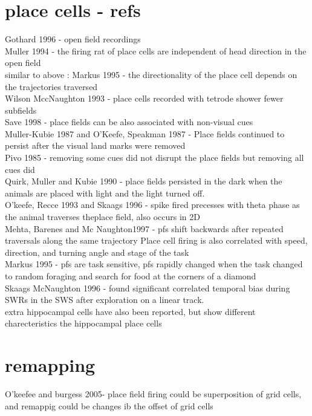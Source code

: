\documentclass{article}
\begin{document}
\section*{place cells - refs}
Gothard 1996 - open field recordings \\
Muller 1994 - the firing rat of place cells are independent of head direction in the open field\\
similar to above : Markus 1995 - the directionality of the place cell depends on the trajectories traversed\\
Wilson MccNaughton 1993 - place cells recorded with tetrode shower fewer subfields\\
Save 1998 - place fields can be also associated with non-visual cues\\
Muller-Kubie 1987 and O'Keefe, Speakman 1987 - Place fields continued to persist after the visual land marks were removed \\
Pivo 1985 - removing some cues did not disrupt the place fields but removing all cues did\\
Quirk, Muller and Kubie 1990 - place fields persisted in the dark when the animals are placed with light and the light turned off.\\
O'keefe, Recce 1993 and Skaags 1996 - spike fired precesses with theta phase as the animal traverses theplace field, also occurs in 2D\\
Mehta, Barenes and Mc Naughton1997 - pfs shift backwards after repeated traversals along the same trajectory 
Place cell firing is also correlated with speed, direction, and turning angle  and stage of the task \\
Markus 1995 - pfs are task sensitive, pfs rapidly changed when the task changed to random foraging and search for food at the corners of a diamond\\
Skaags McNaughton 1996 - found significant correlated temporal bias during SWRs in the SWS after exploration on a linear track.\\
extra hippocampal cells have also been reported, but show different charecteristics the hippocampal place cells\\





\section*{remapping}
O'keefee and burgess 2005- place field firing could be superposition of grid cells, and remappig could be changes ib the offset of grid cells



\end{document}
